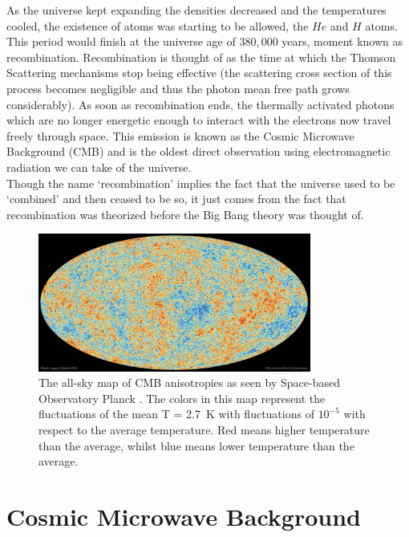 As the universe kept expanding the densities decreased and the temperatures cooled, the existence of atoms was starting to be allowed, the $He$ and $H$ atoms. This period would finish at the universe age of $380,000$ years, moment known as recombination. Recombination is thought of as the time at which the Thomson Scattering mechanisms stop being effective (the scattering cross section of this process becomes negligible and thus the photon mean free path grows considerably).
As soon as recombination ends, the thermally activated photons which are no longer energetic enough to interact with the electrons now travel freely through space. This emission is known as the Cosmic Microwave Background (CMB) and is the oldest direct observation using electromagnetic radiation we can take of the universe. \\

Though the name `recombination' implies the fact that the universe used to be `combined' and then ceased to be so, it just comes from the fact that recombination was theorized before the Big Bang theory was thought of. \\



\begin{figure}[t]
	\centering
	\includegraphics[width=0.8\textwidth]{../figs/cmb.jpeg}
	\caption[The all-sky map of CMB anisotropies as seen by space-based Observatory Planck]{The all-sky map of CMB anisotropies as seen by Space-based Observatory Planck \cite{Planck2018}. The colors in this map represent the fluctuations of the mean T = \SI{2.7}{K} with fluctuations of $10^{-5}$ with respect to the average temperature. Red means higher temperature than the average, whilst blue means lower temperature than the average.}
	\label{fig:cmb}
\end{figure}
\section{Cosmic Microwave Background}


